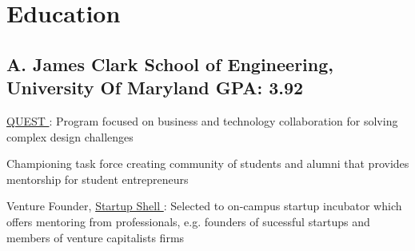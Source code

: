 \documentclass[]{jack-resume}
\begin{document}
%
%



%
%
\begin{minipage}[t][1cm][t]{.03\textwidth} 
\hfill
\end{minipage} 


\section{Education} 
\subsection{A. James Clark School of Engineering, University Of Maryland \hfill GPA: 3.92}
 \hfill {}
\begin{tightemize}
    \item \href{https://www.rhsmith.umd.edu/programs/undergraduate-programs/academics/fellows-special-programs/quest}{QUEST \ExternalLink}: Program focused on business and technology collaboration for solving complex design challenges
    \item Championing task force creating community of students and alumni that provides mentorship for student entrepreneurs
    \item Venture Founder, \href{https://startupshell.org/}{Startup Shell \ExternalLink}: Selected to on-campus startup incubator which offers mentoring from professionals, e.g. founders of sucessful startups and members of venture capitalists firms
\end{tightemize}
\end{document}
